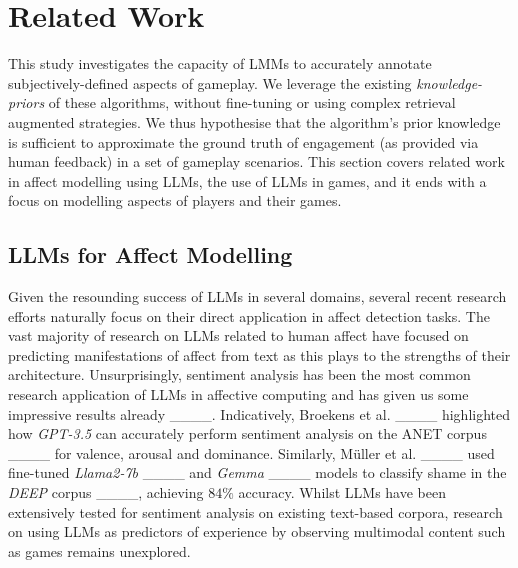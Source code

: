 \section{Related Work}
\label{sec:background}

This study investigates the capacity of LMMs to accurately annotate subjectively-defined aspects of gameplay. We leverage the existing \emph{knowledge-priors} of these algorithms, without fine-tuning or using complex retrieval augmented strategies. We thus hypothesise that the algorithm's prior knowledge is sufficient to approximate the ground truth of engagement (as provided via human feedback) in a set of gameplay scenarios. This section covers related work in affect modelling using LLMs, the use of LLMs in games, and it ends with a focus on modelling aspects of players and their games.

\subsection{LLMs for Affect Modelling}

Given the resounding success of LLMs in several domains, several recent research efforts naturally focus on their direct application in affect detection tasks. The vast majority of research on LLMs related to human affect have focused on predicting manifestations of affect from text as this plays to the strengths of their architecture. Unsurprisingly, sentiment analysis has been the most common research application of LLMs in affective computing and has given us some impressive results already ____. Indicatively, Broekens et al. ____ highlighted how \emph{GPT-3.5} can accurately perform sentiment analysis on the ANET corpus ____ for valence, arousal and dominance. Similarly, Müller et al. ____ used fine-tuned \emph{Llama2-7b} ____ and \emph{Gemma} ____ models to classify shame in the \emph{DEEP} corpus ____, achieving $84\%$ accuracy. Whilst LLMs have been extensively tested for sentiment analysis on existing text-based corpora, research on using LLMs as predictors of experience by observing multimodal content such as games remains unexplored. 

